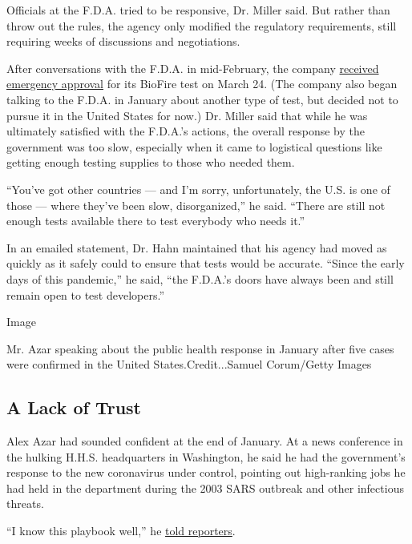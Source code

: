 Officials at the F.D.A. tried to be responsive, Dr. Miller said. But
rather than throw out the rules, the agency only modified the regulatory
requirements, still requiring weeks of discussions and negotiations.

After conversations with the F.D.A. in mid-February, the company
\href{https://www.biomerieux.com/en/biomerieux-receives-emergency-use-authorization-biofirer-covid-19-test}{received
emergency approval} for its BioFire test on March 24. (The company also
began talking to the F.D.A. in January about another type of test, but
decided not to pursue it in the United States for now.) Dr. Miller said
that while he was ultimately satisfied with the F.D.A.'s actions, the
overall response by the government was too slow, especially when it came
to logistical questions like getting enough testing supplies to those
who needed them.

``You've got other countries --- and I'm sorry, unfortunately, the U.S.
is one of those --- where they've been slow, disorganized,'' he said.
``There are still not enough tests available there to test everybody who
needs it.''

In an emailed statement, Dr. Hahn maintained that his agency had moved
as quickly as it safely could to ensure that tests would be accurate.
``Since the early days of this pandemic,'' he said, ``the F.D.A.'s doors
have always been and still remain open to test developers.''

Image

Mr. Azar speaking about the public health response in January after five
cases were confirmed in the United States.Credit...Samuel Corum/Getty
Images

\hypertarget{a-lack-of-trust}{%
\subsection{A Lack of Trust}\label{a-lack-of-trust}}

Alex Azar had sounded confident at the end of January. At a news
conference in the hulking H.H.S. headquarters in Washington, he said he
had the government's response to the new coronavirus under control,
pointing out high-ranking jobs he had held in the department during the
2003 SARS outbreak and other infectious threats.

``I know this playbook well,'' he
\href{https://www.hhs.gov/about/leadership/secretary/speeches/2020-speeches/remarks-at-coronavirus-press-briefing.html}{told
reporters}.

